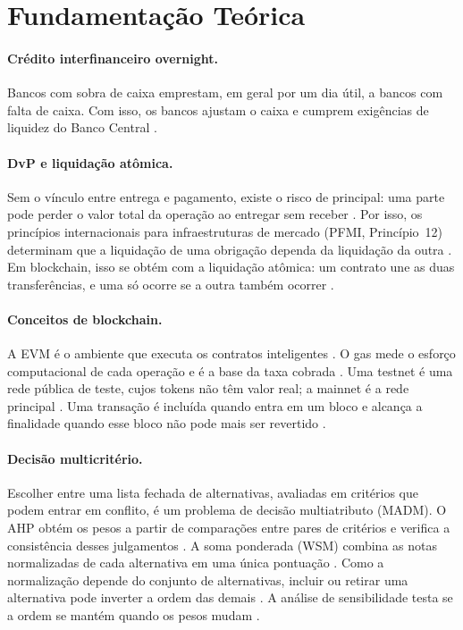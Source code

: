 \documentclass[10pt,a4paper]{article}
\begin{document}
\section{Fundamentação Teórica}\label{sec:fundamentacao}

\paragraph{Crédito interfinanceiro overnight.} Bancos com sobra de caixa emprestam, em geral por um dia útil, a bancos com falta de caixa. Com isso, os bancos ajustam o caixa e cumprem exigências de liquidez do Banco Central \cite{b3taxadi}.

\paragraph{DvP e liquidação atômica.} Sem o vínculo entre entrega e pagamento, existe o risco de principal: uma parte pode perder o valor total da operação ao entregar sem receber \cite{bis1992dvp}. Por isso, os princípios internacionais para infraestruturas de mercado (PFMI, Princípio~12) determinam que a liquidação de uma obrigação dependa da liquidação da outra \cite{cpss2012pfmi}. Em blockchain, isso se obtém com a liquidação atômica: um contrato une as duas transferências, e uma só ocorre se a outra também ocorrer \cite{bis2020qr}.

\paragraph{Conceitos de blockchain.} A EVM é o ambiente que executa os contratos inteligentes \cite{ethereum2024evm}. O gas mede o esforço computacional de cada operação e é a base da taxa cobrada \cite{ethereum2024gas}. Uma testnet é uma rede pública de teste, cujos tokens não têm valor real; a mainnet é a rede principal \cite{ethereum2024networks}. Uma transação é incluída quando entra em um bloco e alcança a finalidade quando esse bloco não pode mais ser revertido \cite{ethereum2024gasper}.

\paragraph{Decisão multicritério.} Escolher entre uma lista fechada de alternativas, avaliadas em critérios que podem entrar em conflito, é um problema de decisão multiatributo (MADM). O AHP obtém os pesos a partir de comparações entre pares de critérios e verifica a consistência desses julgamentos \cite{saaty2001}. A soma ponderada (WSM) combina as notas normalizadas de cada alternativa em uma única pontuação \cite{fishburn1967}. Como a normalização depende do conjunto de alternativas, incluir ou retirar uma alternativa pode inverter a ordem das demais \cite{belton1983}. A análise de sensibilidade testa se a ordem se mantém quando os pesos mudam \cite{triantaphyllou1997}.
\end{document}
